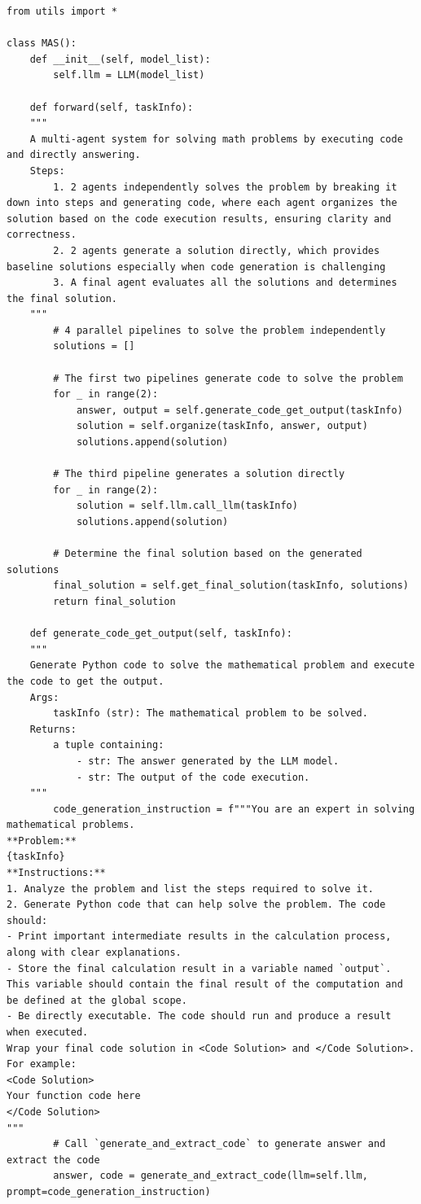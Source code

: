 \documentclass{article}
\theoremstyle{plain}
\theoremstyle{definition}
\theoremstyle{remark}
\begin{document}
\begin{lstlisting}[caption={Case 2: Multi-agent system generated by MAS-GPT. MAS-GPT can generalize to unseen queries from SciBench~\cite{wangscibench}, generating an appropriate multi-agent system to handle the query.}, label={case2_mas}]
from utils import *

class MAS():
    def __init__(self, model_list):
        self.llm = LLM(model_list)
    
    def forward(self, taskInfo):
    """
    A multi-agent system for solving math problems by executing code and directly answering.
    Steps:
        1. 2 agents independently solves the problem by breaking it down into steps and generating code, where each agent organizes the solution based on the code execution results, ensuring clarity and correctness.
        2. 2 agents generate a solution directly, which provides baseline solutions especially when code generation is challenging
        3. A final agent evaluates all the solutions and determines the final solution.
    """
        # 4 parallel pipelines to solve the problem independently
        solutions = []
        
        # The first two pipelines generate code to solve the problem
        for _ in range(2):
            answer, output = self.generate_code_get_output(taskInfo)
            solution = self.organize(taskInfo, answer, output)
            solutions.append(solution)
        
        # The third pipeline generates a solution directly
        for _ in range(2):
            solution = self.llm.call_llm(taskInfo)
            solutions.append(solution)
        
        # Determine the final solution based on the generated solutions
        final_solution = self.get_final_solution(taskInfo, solutions)
        return final_solution

    def generate_code_get_output(self, taskInfo):
    """
    Generate Python code to solve the mathematical problem and execute the code to get the output.
    Args:
        taskInfo (str): The mathematical problem to be solved.
    Returns:
        a tuple containing:
            - str: The answer generated by the LLM model.
            - str: The output of the code execution.
    """
        code_generation_instruction = f"""You are an expert in solving mathematical problems.
**Problem:**
{taskInfo}
**Instructions:**
1. Analyze the problem and list the steps required to solve it.
2. Generate Python code that can help solve the problem. The code should:
- Print important intermediate results in the calculation process, along with clear explanations.
- Store the final calculation result in a variable named `output`. This variable should contain the final result of the computation and be defined at the global scope.
- Be directly executable. The code should run and produce a result when executed.
Wrap your final code solution in <Code Solution> and </Code Solution>. For example:
<Code Solution>
Your function code here
</Code Solution>
"""
        # Call `generate_and_extract_code` to generate answer and extract the code
        answer, code = generate_and_extract_code(llm=self.llm, prompt=code_generation_instruction)
        

\end{lstlisting}
\end{document}
